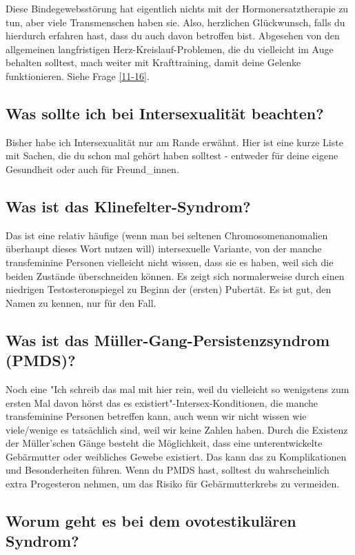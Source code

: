 \documentclass{article}
\begin{document}
Diese Bindegewebsstörung hat eigentlich nichts mit der Hormonersatztherapie zu tun, aber viele Transmenschen haben sie. Also, herzlichen Glückwunsch, falls du hierdurch erfahren hast, dass du auch davon betroffen bist. Abgesehen von den allgemeinen langfristigen Herz-Kreislauf-Problemen, die du vielleicht im Auge behalten solltest, mach weiter mit Krafttraining, damit deine Gelenke funktionieren. Siehe Frage \ref{11-16}.

\subsection{Was sollte ich bei Intersexualität beachten?}

Bisher habe ich Intersexualität nur am Rande erwähnt. Hier ist eine kurze Liste mit Sachen, die du schon mal gehört haben solltest - entweder für deine eigene Gesundheit oder auch für Freund\_innen.

\subsection{Was ist das Klinefelter-Syndrom?}

Das ist eine relativ häufige (wenn man bei seltenen Chromosomenanomalien überhaupt dieses Wort nutzen will) intersexuelle Variante, von der manche transfeminine Personen vielleicht nicht wissen, dass sie es haben, weil sich die beiden Zustände überschneiden können. Es zeigt sich normalerweise durch einen niedrigen Testosteronspiegel zu Beginn der (ersten) Pubertät. Es ist gut, den Namen zu kennen, nur für den Fall.

\subsection{Was ist das Müller-Gang-Persistenzsyndrom (PMDS)?}

Noch eine "Ich schreib das mal mit hier rein, weil du vielleicht so wenigstens zum ersten Mal davon hörst das es existiert"-Intersex-Konditionen, die manche transfeminine Personen betreffen kann, auch wenn wir nicht wissen wie viele/wenige es tatsächlich sind, weil wir keine Zahlen haben. Durch die Existenz der Müller'schen Gänge besteht die Möglichkeit, dass eine unterentwickelte Gebärmutter oder weibliches Gewebe existiert. Das kann das zu Komplikationen und Besonderheiten führen. Wenn du PMDS hast, solltest du wahrscheinlich extra Progesteron nehmen, um das Risiko für Gebärmutterkrebs zu vermeiden.

\subsection{Worum geht es bei dem ovotestikulären Syndrom?}
\end{document}
